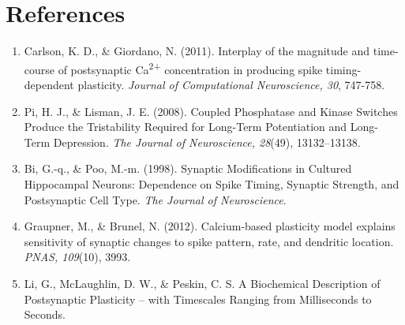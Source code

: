 \documentclass{article}
\begin{document}
\section{References}
\begin{enumerate}

    \item Carlson, K. D., \& Giordano, N. (2011). Interplay of the magnitude and time-course of postsynaptic Ca\textsuperscript{2+} concentration in producing spike timing-dependent plasticity. \emph{Journal of Computational Neuroscience, 30}, 747-758.
    \item Pi, H. J., \& Lisman, J. E. (2008). Coupled Phosphatase and Kinase Switches Produce the Tristability Required for Long-Term Potentiation and Long-Term Depression. \emph{The Journal of Neuroscience, 28}(49), 13132–13138.
    \item Bi, G.-q., \& Poo, M.-m. (1998). Synaptic Modifications in Cultured Hippocampal Neurons: Dependence on Spike Timing, Synaptic Strength, and Postsynaptic Cell Type. \emph{The Journal of Neuroscience}.
    \item Graupner, M., \& Brunel, N. (2012). Calcium-based plasticity model explains sensitivity of synaptic changes to spike pattern, rate, and dendritic location. \emph{PNAS, 109}(10), 3993.
    \item Li, G., McLaughlin, D. W., \& Peskin, C. S. A Biochemical Description of Postsynaptic Plasticity – with Timescales Ranging from Milliseconds to Seconds.
    
\end{enumerate} 
\end{document}
